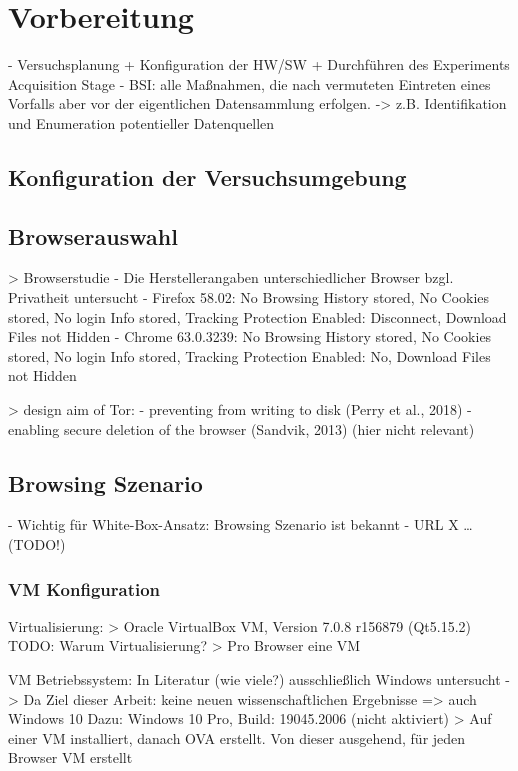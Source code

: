 \section{Vorbereitung}

- \cite{Izzati.2022} Versuchsplanung + Konfiguration der HW/SW + Durchführen des Experiments Acquisition Stage
- BSI: alle Maßnahmen, die nach vermuteten Eintreten eines Vorfalls aber vor der eigentlichen Datensammlung erfolgen. 
	-> z.B. Identifikation und Enumeration potentieller Datenquellen

\subsection{Konfiguration der Versuchsumgebung}

\subsection{Browserauswahl}

> Browserstudie \cite{Izzati.2022}
- Die Herstellerangaben unterschiedlicher Browser bzgl. Privatheit untersucht
- Firefox 58.02: No Browsing History stored, No Cookies stored, No login Info stored, Tracking Protection Enabled: Disconnect, Download Files not Hidden
- Chrome 63.0.3239: No Browsing History stored, No Cookies stored, No login Info stored, Tracking Protection Enabled: No, Download Files not Hidden

> design aim of Tor: \cite{Muir.2019}
- preventing from writing to disk (Perry et al., 2018) 
- enabling secure deletion of the browser (Sandvik, 2013) (hier nicht relevant)

\subsection{Browsing Szenario}
- Wichtig für White-Box-Ansatz: Browsing Szenario ist bekannt
- URL X … 	(TODO!)

\subsubsection*{VM Konfiguration}

Virtualisierung:
	> Oracle VirtualBox VM, Version 7.0.8 r156879 (Qt5.15.2)
	TODO: Warum Virtualisierung?
	> Pro Browser eine VM

VM Betriebssystem: In Literatur (wie viele?) ausschließlich Windows untersucht -> Da Ziel dieser Arbeit: keine neuen wissenschaftlichen Ergebnisse => auch Windows 10
	Dazu: Windows 10 Pro, Build: 19045.2006 (nicht aktiviert)
	> Auf einer VM installiert, danach OVA erstellt. Von dieser ausgehend, für jeden Browser VM erstellt

